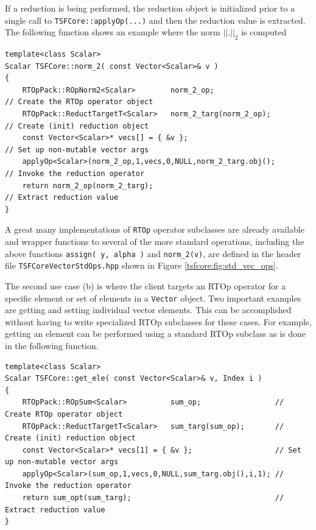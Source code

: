 If a reduction is being performed, the reduction object is initialized
prior to a single call to \texttt{TSFCore::applyOp(\-...)} and then the
reduction value is extracted.  The following function shows an example
where the norm $||.||_2$ is computed

{\scriptsize\begin{verbatim}
template<class Scalar>
Scalar TSFCore::norm_2( const Vector<Scalar>& v )
{
    RTOpPack::ROpNorm2<Scalar>        norm_2_op;                     // Create the RTOp operator object
    RTOpPack::ReductTargetT<Scalar>   norm_2_targ(norm_2_op);        // Create (init) reduction object
    const Vector<Scalar>* vecs[] = { &v };                           // Set up non-mutable vector args
    applyOp<Scalar>(norm_2_op,1,vecs,0,NULL,norm_2_targ.obj();       // Invoke the reduction operator
    return norm_2_op(norm_2_targ);                                   // Extract reduction value
}
\end{verbatim}}

\noindent A great many implementations of \texttt{RTOp} operator subclasses are
already available and wrapper functions to several of the more
standard operations, including the above functions
\texttt{assign( y, alpha )} and \texttt{norm\_2(v)},
are defined in the header file \texttt{TSFCore\-Vector\-Std\-Ops.hpp}
shown in Figure \ref{tsfcore:fig:std_vec_ops}.

The second use case (b) is where the client targets an RTOp operator
for a specific element or set of elements in a \texttt{Vector} object.
Two important examples are getting and setting individual vector
elements.  This can be accomplished without having to write specialized
RTOp subclasses for these cases.  For example, getting an element
can be performed using a standard RTOp subclass as is done
in the following function.

{\scriptsize\begin{verbatim}
template<class Scalar>
Scalar TSFCore::get_ele( const Vector<Scalar>& v, Index i )
{
    RTOpPack::ROpSum<Scalar>          sum_op;                 // Create RTOp operator object
    RTOpPack::ReductTargetT<Scalar>   sum_targ(sum_op);       // Create (init) reduction object
    const Vector<Scalar>* vecs[1] = { &v };                   // Set up non-mutable vector args
    applyOp<Scalar>(sum_op,1,vecs,0,NULL,sum_targ.obj(),i,1); // Invoke the reduction operator
    return sum_opt(sum_targ);                                 // Extract reduction value
}
\end{verbatim}}

